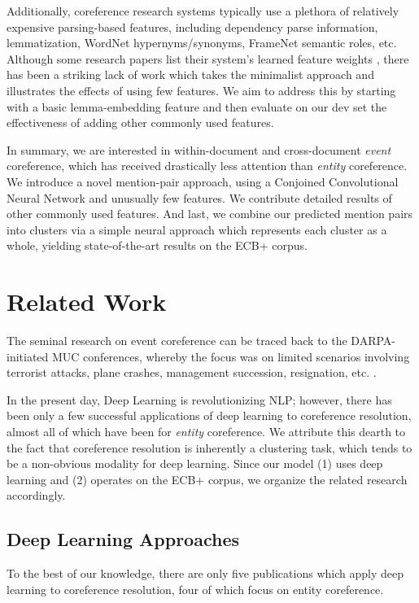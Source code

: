 \documentclass[11pt,a4paper]{article}
\begin{document}
Additionally, coreference research systems typically use a plethora of relatively expensive parsing-based features, including dependency parse information, lemmatization, WordNet hypernyms/synonyms, FrameNet semantic roles, etc.  Although some research papers list their system's learned feature weights \cite{journals/tacl/YangCF15}, there has been a striking lack of work which takes the minimalist approach and illustrates the effects of using few features.  We aim to address this by starting with a basic lemma-embedding feature and then evaluate on our dev set the effectiveness of adding other commonly used features.

In summary, we are interested in within-document and cross-document \textit{event} coreference, which has received drastically less attention than \textit{entity} coreference. We introduce a novel mention-pair approach, using a Conjoined Convolutional Neural Network and unusually few features.  We contribute detailed results of other commonly used features.  And last, we combine our predicted mention pairs into clusters via a simple neural approach which represents each cluster as a whole, yielding state-of-the-art results on the ECB+ corpus.


\section{Related Work}
The seminal research on event coreference can be traced back to the DARPA-initiated MUC conferences, whereby the focus was on limited scenarios involving terrorist attacks, plane crashes, management succession, resignation, etc. \cite{Humphreys:1997,Bagga:1999:CEC:1608810.1608812}.

In the present day, Deep Learning is revolutionizing NLP; however, there has been only a few successful applications of deep learning to coreference resolution, almost all of which have been for \textit{entity} coreference.  We attribute this dearth to the fact that coreference resolution is inherently a clustering task, which tends to be a non-obvious modality for deep learning.  Since our model (1) uses deep learning and (2) operates on the ECB+ corpus, we organize the related research accordingly.

\subsection{Deep Learning Approaches}
To the best of our knowledge, there are only five publications which apply deep learning to coreference resolution, four of which focus on entity coreference.
\end{document}

